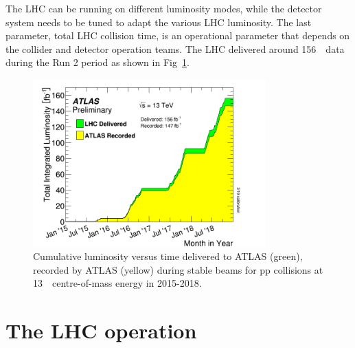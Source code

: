 \par The LHC can be running on different luminosity modes, while the detector system needs to be tuned to adapt the various LHC luminosity. The last parameter, total LHC collision time, is an operational parameter that depends on the collider and detector operation teams. The LHC delivered around 156~\ifb~data during the Run 2 period as shown in Fig~\ref{fig:lumi}.
\begin{figure}[htbp]
    \centering
    \includegraphics[width=0.8\textwidth]{chapters/c4/figures/intlumivstimeRun2}
    \caption{Cumulative luminosity versus time delivered to ATLAS (green), recorded by ATLAS (yellow) during stable beams for pp collisions at 13~\TeV~centre-of-mass energy in 2015-2018.}
    \label{fig:lumi}
\end{figure}

\section{The LHC operation}
\label{sec:lhcs1}

